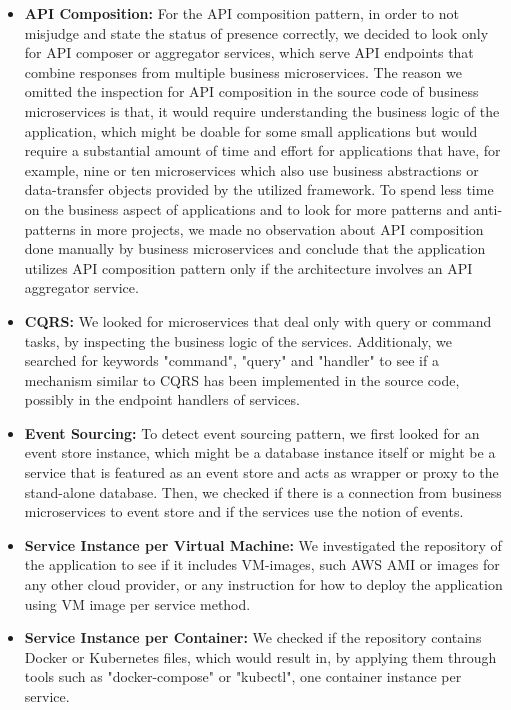 \documentclass{Configuration_Files/PoliMi3i_thesis}
\begin{document}
\begin{itemize}
\begin{itemize}
        \item \textbf{API Composition:} For the API composition pattern, in order to not misjudge and state the status of presence correctly, we decided to look only for API composer or aggregator services, which serve API endpoints that combine responses from multiple business microservices.
        The reason we omitted the inspection for API composition in the source code of business microservices is that, it would require understanding the business logic of the application, which might be doable for some small applications but would require a substantial amount of time and effort for applications that have, for example, nine or ten microservices which also use business abstractions or data-transfer objects provided by the utilized framework.
        To spend less time on the business aspect of applications and to look for more patterns and anti-patterns in more projects, we made no observation about API composition done manually by business microservices and conclude that the application utilizes API composition pattern only if the architecture involves an API aggregator service.
        
        \item \textbf{CQRS:} We looked for microservices that deal only with query or command tasks, by inspecting the business logic of the services. 
        Additionaly, we searched for keywords "command", "query" and "handler" to see if a mechanism similar to CQRS has been implemented in the source code, possibly in the endpoint handlers of services.
        
        \item \textbf{Event Sourcing:} To detect event sourcing pattern, we first looked for an event store instance, which might be a database instance itself or might be a service that is featured as an event store and acts as wrapper or proxy to the stand-alone database.
        Then, we checked if there is a connection from business microservices to event store and if the services use the notion of events.
        
        \item \textbf{Service Instance per Virtual Machine:} We investigated the repository of the application to see if it includes VM-images, such AWS AMI or images for any other cloud provider, or any instruction for how to deploy the application using VM image per service method.
        
        \item \textbf{Service Instance per Container:} We checked if the repository contains Docker or Kubernetes files, which would result in, by applying them through tools such as "docker-compose" or "kubectl", one container instance per service.
        

\end{itemize}
\end{itemize}
\end{document}
